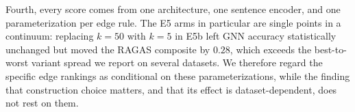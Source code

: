Fourth, every score comes from one architecture, one sentence encoder, and one
parameterization per edge rule. The E5 arms in particular are single points in
a continuum: replacing $k=50$ with $k=5$ in E5b left GNN accuracy statistically
unchanged but moved the RAGAS composite by $0.28$, which exceeds the
best-to-worst variant spread we report on several datasets. We therefore regard
the specific edge rankings as conditional on these parameterizations, while the
finding that construction choice matters, and that its effect is
dataset-dependent, does not rest on them.
